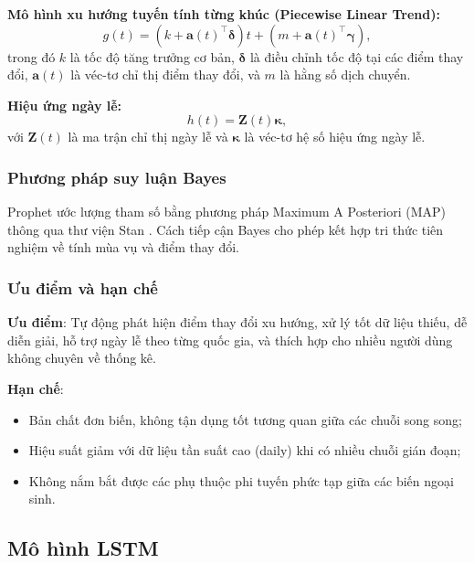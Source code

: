 \textbf{Mô hình xu hướng tuyến tính từng khúc (Piecewise Linear Trend):}
\begin{equation}
    g(t) = (k + \mathbf{a}(t)^\top \boldsymbol{\delta}) t + (m + \mathbf{a}(t)^\top \boldsymbol{\gamma}),
    \label{eq:prophet_trend}
\end{equation}
trong đó $k$ là tốc độ tăng trưởng cơ bản, $\boldsymbol{\delta}$ là điều chỉnh tốc độ tại các điểm thay đổi, $\mathbf{a}(t)$ là véc-tơ chỉ thị điểm thay đổi, và $m$ là hằng số dịch chuyển.

\textbf{Hiệu ứng ngày lễ:}
\begin{equation}
    h(t) = \mathbf{Z}(t) \boldsymbol{\kappa},
    \label{eq:prophet_holiday}
\end{equation}
với $\mathbf{Z}(t)$ là ma trận chỉ thị ngày lễ và $\boldsymbol{\kappa}$ là véc-tơ hệ số hiệu ứng ngày lễ.

\subsubsection{Phương pháp suy luận Bayes}

Prophet ước lượng tham số bằng phương pháp Maximum A Posteriori (MAP) thông qua thư viện Stan \citep{carpenter2017stan}. Cách tiếp cận Bayes cho phép kết hợp tri thức tiên nghiệm về tính mùa vụ và điểm thay đổi.

\subsubsection{Ưu điểm và hạn chế}

\textbf{Ưu điểm}: Tự động phát hiện điểm thay đổi xu hướng, xử lý tốt dữ liệu thiếu, dễ diễn giải, hỗ trợ ngày lễ theo từng quốc gia, và thích hợp cho nhiều người dùng không chuyên về thống kê.

\textbf{Hạn chế}:
\begin{itemize}
    \item Bản chất đơn biến, không tận dụng tốt tương quan giữa các chuỗi song song;
    \item Hiệu suất giảm với dữ liệu tần suất cao (daily) khi có nhiều chuỗi gián đoạn;
    \item Không nắm bắt được các phụ thuộc phi tuyến phức tạp giữa các biến ngoại sinh.
\end{itemize}

\subsection{Mô hình LSTM}
\label{subsec:lstm}


